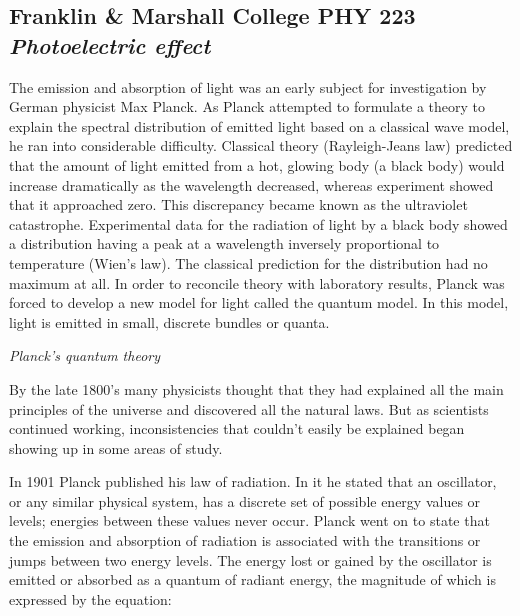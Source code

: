 \documentclass[11pt]{article}
\begin{document}
\begin{center}
\section*{
Franklin \& Marshall College \hfill PHY 223\\
\bigskip
{\Large \it Photoelectric effect}}
\end{center}

The emission and absorption of light was an early subject for investigation by
German physicist Max Planck. As Planck attempted to formulate a theory to
explain the spectral distribution of emitted light based on a classical wave
model, he ran into considerable difficulty. Classical theory (Rayleigh-Jeans
law) predicted that the amount of light emitted from a hot, glowing body (a
black body) would increase dramatically as the wavelength decreased, whereas
experiment showed that it approached zero. This discrepancy became known as the
ultraviolet catastrophe. Experimental data for the radiation of light by a black
body showed a distribution having a peak at a wavelength inversely proportional
to temperature (Wien’s law). The classical prediction for the distribution had
no maximum at all. In order to reconcile theory with laboratory results, Planck
was forced to develop a new model for light called the quantum model. In this
model, light is emitted in small, discrete bundles or quanta.

\vspace{5mm}


\vspace{3mm}

\begin{center}
{\it Planck's quantum theory}
\end{center}

By the late 1800's many physicists thought that they had explained all the main
principles of the universe and discovered all the natural laws. But as
scientists continued working, inconsistencies that couldn't easily be explained
began showing up in some areas of study.

In 1901 Planck published his law of radiation. In it he stated that an
oscillator, or any similar physical system, has a discrete set of possible
energy values or levels; energies between these values never occur. Planck went
on to state that the emission and absorption of radiation is associated with the
transitions or jumps between two energy levels. The energy lost or gained by the
oscillator is emitted or absorbed as a quantum of radiant energy, the magnitude
of which is expressed by the equation:
\end{document}
